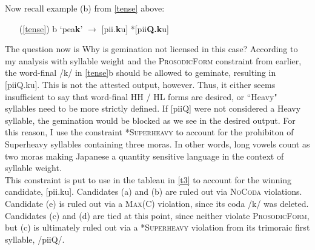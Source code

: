 \documentclass{article}
\begin{document}
Now recall example (b) from \ref{tense} above:

\begin{exe}
\begin{itemize}
    \item [(\ref{tense}) b] ‘pea\textbf{k}' $\rightarrow$ [pii.\textbf{k}u] \hspace{1cm} *[pii\textbf{Q.k}u] 
\end{itemize}
\end{exe}

The question now is Why is gemination not licensed in this case? According to my analysis with syllable weight and the \textsc{ProsodicForm} constraint from earlier, the word-final /k/ in \ref{tense}b should be allowed to geminate, resulting in [piiQ.ku]. This is not the attested output, however. Thus, it either seems insufficient to say that word-final HH / HL forms are desired, or “Heavy" syllables need to be more strictly defined. If [piiQ] were not considered a Heavy syllable, the gemination would be blocked as we see in the desired output. For this reason, I use the constraint \textsc{*Superheavy} to account for the prohibiton of Superheavy syllables containing three moras. In other words, long vowels count as two moras making Japanese a quantity sensitive language in the context of syllable weight. \\

This constraint is put to use in the tableau in \ref{t3} to account for the winning candidate, [pii.ku]. Candidates (a) and (b) are ruled out via \textsc{NoCoda} violations. Candidate (e) is ruled out via a \textsc{Max(C)} violation, since its coda /k/ was deleted. Candidates (c) and (d) are tied at this point, since neither violate \textsc{ProsodicForm}, but (c) is ultimately ruled out via a \textsc{*Superheavy} violation from its trimoraic first syllable, /piiQ/. 
\end{document}
